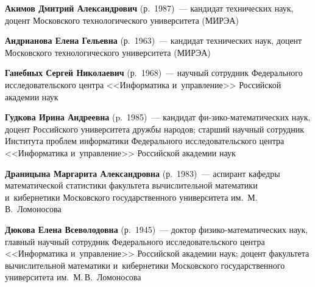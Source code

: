 \begin{multicols}{2}

\noindent
\textbf{Акимов Дмитрий Александрович} (р.\ 1987)~--- 
кандидат технических наук, доцент Московского технологического университета (МИРЭА)

\vspace*{3pt} 



\noindent
\textbf{Андрианова Елена Гельевна} (р.\ 1963)~--- 
кандидат технических наук, доцент Московского технологического университета (МИРЭА)

\vspace*{3pt} 

\noindent
\textbf{Ганебных Сергей Николаевич} (р.\ 1968)~--- 
научный сотрудник Федерального исследовательского центра <<Информатика и~управ\-ле\-ние>>
Российской академии наук 

\vspace*{3pt} 

\noindent
\textbf{Гудкова Ирина Андреевна} (p.\ 1985)~--- 
кандидат фи-\linebreak зико-ма\-те\-ма\-ти\-че\-ских наук, доцент Российского\linebreak 
университета дружбы народов; старший научный сотрудник Института проб\-лем 
информатики Федерального исследовательского центра <<Информатика и~управ\-ле\-ние>> 
Российской академии наук

 

\vspace*{3pt} 

\noindent
\textbf{Драницына Маргарита Александровна} (р.\ 1983)~---
аспирант кафедры математической статистики факультета вычислительной математики 
и~кибернетики Московского государственного университета им.\ М.\,В.~Ломоносова 

\vspace*{3pt} 

\noindent
\textbf{Дюкова Елена Всеволодовна} (р.\ 1945)~---
доктор фи\-зи\-ко-ма\-те\-ма\-ти\-че\-ских наук, главный научный сотрудник 
Федерального исследовательского центра <<Информатика и~управ\-ле\-ние>>
Российской академии наук; доцент факультета вычислительной математики 
и~кибернетики Московского государственного университета им.\ М.\,В.~Ломоносова


\end{multicols}
